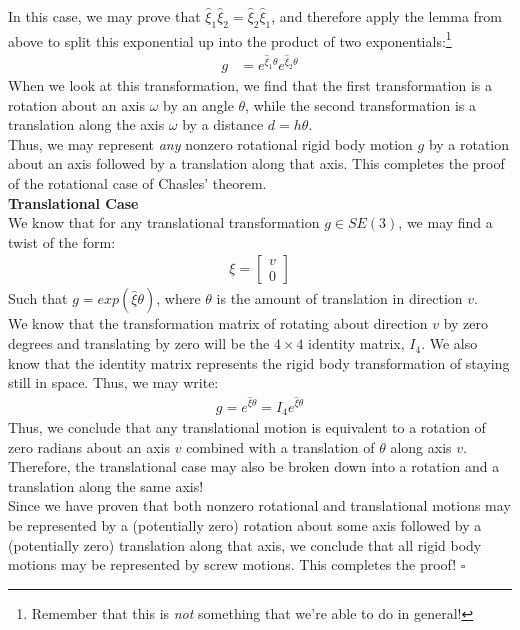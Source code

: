 \documentclass[oneside]{book}
\begin{document}
In this case, we may prove that $\hat\xi_1\hat\xi_2 = \hat\xi_2\hat\xi_1$, and therefore apply the lemma from above to split this exponential up into the product of two exponentials:\footnote{Remember that this is \textit{not} something that we're able to do in general!}
\begin{align}
    g &= e^{\hat\xi_1\theta}e^{\hat\xi_2\theta}
\end{align}
When we look at this transformation, we find that the first transformation is a rotation about an axis $\omega$ by an angle $\theta$, while the second transformation is a translation along the axis $\omega$ by a distance $d = h\theta$.\\
Thus, we may represent \textit{any} nonzero rotational rigid body motion $g$ by a rotation about an axis followed by a translation along that axis. This completes the proof of the rotational case of Chasles' theorem.\\
\textbf{Translational Case}\\
We know that for any translational transformation $g \in SE(3)$, we may find a twist of the form:
\begin{align}
    \xi = 
    \begin{bmatrix}
    v\\
    0
    \end{bmatrix}
\end{align}
Such that $g = exp(\hat\xi\theta)$, where $\theta$ is the amount of translation in direction $v$.\\
We know that the transformation matrix of rotating about direction $v$ by zero degrees and translating by zero will be the $4\times 4$ identity matrix, $I_4$. We also know that the identity matrix represents the rigid body transformation of staying still in space.
Thus, we may write:
\begin{align}
    g = e^{\hat\xi\theta} = I_4 e^{\hat\xi\theta}
\end{align}
Thus, we conclude that any translational motion is equivalent to a rotation of zero radians about an axis $v$ combined with a translation of $\theta$ along axis $v$. Therefore, the translational case may also be broken down into a rotation and a translation along the same axis!\\
Since we have proven that both nonzero rotational and translational motions may be represented by a (potentially zero) rotation about some axis followed by a (potentially zero) translation along that axis, we conclude that all rigid body motions may be represented by screw motions. This completes the proof! $\square$
\end{document}

